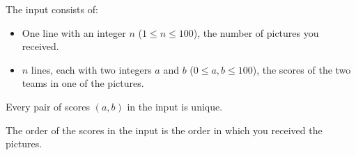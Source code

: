 
    The input consists of:
    \begin{itemize}
        \item One line with an integer $n$ ($1\leq n\leq 100$), the number of pictures you received.
        \item $n$ lines, each with two integers $a$ and $b$ ($0 \leq a,b \leq 100$),
            the scores of the two teams in one of the pictures.
    \end{itemize}
    Every pair of scores $(a, b)$ in the input is unique.

    The order of the scores in the input is the order in which you received the pictures.
